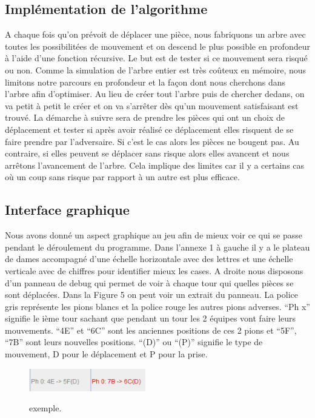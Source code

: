 \documentclass[11pt]{article} %
\begin{document}
\subsection{Implémentation de l’algorithme}

A chaque fois qu'on prévoit de déplacer une pièce, nous fabriquons un arbre avec toutes les possibilitées de mouvement et on descend le plus possible en profondeur à l’aide d’une fonction récursive. Le but est de tester si ce mouvement sera risqué ou non. 
Comme la simulation de l’arbre entier est très coûteux en mémoire, nous limitons notre parcours en profondeur et la façon dont nous cherchons dans l'arbre afin d’optimiser. Au lieu de créer tout l'arbre puis de chercher dedans, on va petit à petit le créer et on va s’arrêter dès qu'un mouvement satisfaisant est trouvé. 
La démarche à suivre sera de prendre les pièces qui ont un choix de déplacement et tester si après avoir réalisé ce déplacement elles risquent de se faire prendre par l'adversaire.
Si c'est le cas alors les pièces ne bougent pas. Au contraire, si elles peuvent se déplacer sans risque alors elles avancent et nous arrêtons l’avancement de l’arbre. 
Cela implique des limites car il y a certains cas où un coup sans risque par rapport à un autre est plus efficace.

\subsection{Interface graphique}

Nous avons donné un aspect graphique au jeu afin de mieux voir ce qui se passe pendant le déroulement du programme. Dans l’annexe 1 à gauche il y a le plateau de dames accompagné d’une échelle horizontale avec des lettres et une échelle verticale avec de chiffres pour identifier mieux les cases. 
A droite nous disposons d’un panneau de debug qui permet de voir à chaque tour qui quelles pièces se sont déplacées. Dans la Figure 5 on peut voir un extrait du panneau. La police gris représente les pions blancs et la police rouge les autres pions adverses. “Ph x” signifie le ième tour sachant que pendant un tour les 2 équipes vont faire leurs mouvements. “4E” et “6C” sont les anciennes positions de ces 2 pions et  “5F”, “7B” sont leurs nouvelles positions. “(D)” ou “(P)” signifie le type de mouvement, D pour le déplacement et P pour la prise.

\begin{figure}[!ht]
\caption{exemple.}
\label{fig_sim}
\centering
{
\includegraphics[width=2in]{6}
\label{paysage}
}
\end{figure}
\end{document}
